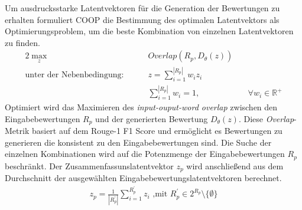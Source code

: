 Um ausdrucksstarke Latentvektoren für die Generation der Bewertungen zu erhalten formuliert COOP die Bestimmung des optimalen Latentvektors als Optimierungsproblem, um die beste Kombination von einzelnen Latentvektoren zu finden.
\begin{alignat}{2}
    \max_z              &\quad&  Overlap(R_p, D_\theta(z))    & \\
    \text{unter der Nebenbedingung: } &\quad&  z = \sum_{i=1}^{|R_p|} w_i z_i \\
                         &\quad&  \sum_{i=1}^{|R_p|}w_i=1,                        &\quad \forall w_i \in \mathbb{R}^+
\end{alignat}
Optimiert wird das Maximieren des \textit{input-ouput-word overlap} zwischen den Eingabebewertungen $R_p$ und der generierten Bewertung $D_\theta(z)$. 
Diese \textit{Overlap}-Metrik basiert auf dem Rouge-1 F1 Score und ermöglicht es Bewertungen zu generieren die konsistent zu den Eingabebewertungen sind.
Die Suche der einzelnen Kombinationen wird auf die Potenzmenge der Eingabebewertungen $R_p$ beschränkt. 
Der Zusammenfassunslatentvektor $z_p$ wird anschließend aus dem Durchschnitt der ausgewählten Eingabebewertungslatentvektoren berechnet.
\begin{align}
z_p = \frac{1}{|R_p^{'}|} \sum_{i=1}^{R_p^{'}}z_i \text{ ,mit } R_p^{'} \in 2^{R_p} \setminus  \{ \emptyset\}
\end{align}


\pagebreak
